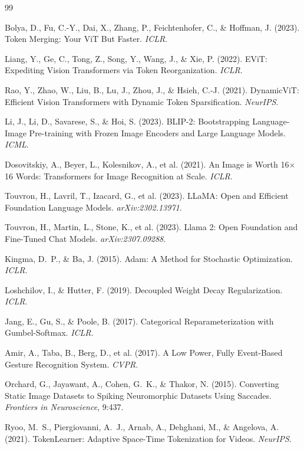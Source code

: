 \documentclass{article}
\begin{document}
{\small
\begin{thebibliography}{99}

Bolya, D., Fu, C.-Y., Dai, X., Zhang, P., Feichtenhofer, C., \& Hoffman, J. (2023). Token Merging: Your ViT But Faster. \emph{ICLR}.

Liang, Y., Ge, C., Tong, Z., Song, Y., Wang, J., \& Xie, P. (2022). EViT: Expediting Vision Transformers via Token Reorganization. \emph{ICLR}.

Rao, Y., Zhao, W., Liu, B., Lu, J., Zhou, J., \& Hsieh, C.-J. (2021). DynamicViT: Efficient Vision Transformers with Dynamic Token Sparsification. \emph{NeurIPS}.

Li, J., Li, D., Savarese, S., \& Hoi, S. (2023). BLIP-2: Bootstrapping Language-Image Pre-training with Frozen Image Encoders and Large Language Models. \emph{ICML}.

Dosovitskiy, A., Beyer, L., Kolesnikov, A., et al. (2021). An Image is Worth 16$\times$16 Words: Transformers for Image Recognition at Scale. \emph{ICLR}.

Touvron, H., Lavril, T., Izacard, G., et al. (2023). LLaMA: Open and Efficient Foundation Language Models. \emph{arXiv:2302.13971}.

Touvron, H., Martin, L., Stone, K., et al. (2023). Llama 2: Open Foundation and Fine-Tuned Chat Models. \emph{arXiv:2307.09288}.

Kingma, D.~P., \& Ba, J. (2015). Adam: A Method for Stochastic Optimization. \emph{ICLR}.

Loshchilov, I., \& Hutter, F. (2019). Decoupled Weight Decay Regularization. \emph{ICLR}.

Jang, E., Gu, S., \& Poole, B. (2017). Categorical Reparameterization with Gumbel-Softmax. \emph{ICLR}.

Amir, A., Taba, B., Berg, D., et al. (2017). A Low Power, Fully Event-Based Gesture Recognition System. \emph{CVPR}.

Orchard, G., Jayawant, A., Cohen, G.~K., \& Thakor, N. (2015). Converting Static Image Datasets to Spiking Neuromorphic Datasets Using Saccades. \emph{Frontiers in Neuroscience}, 9:437.

Ryoo, M.~S., Piergiovanni, A.~J., Arnab, A., Dehghani, M., \& Angelova, A. (2021). TokenLearner: Adaptive Space-Time Tokenization for Videos. \emph{NeurIPS}.


\end{thebibliography}}
\end{document}
